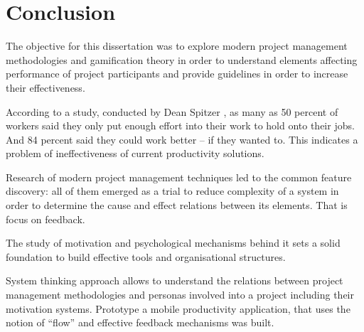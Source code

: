 \chapter*{Conclusion}

The objective for this dissertation was to explore modern project management methodologies and gamification theory in order to understand elements affecting performance of project participants and provide guidelines in order to increase their effectiveness.

According to a study, conducted by Dean Spitzer \cite{spitzer}, as many as 50 percent of workers said they only put enough effort into their work to hold onto their jobs. And 84 percent said they could work better -- if they wanted to. This indicates a problem of ineffectiveness of current productivity solutions.

Research of modern project management techniques led to the common feature discovery: all of them emerged as a trial to reduce complexity of a system in order to determine the cause and effect relations between its elements. That is focus on feedback.

The study of motivation and psychological mechanisms behind it sets a solid foundation to build effective tools and organisational structures.

System thinking approach allows to understand the relations between project management methodologies and personas involved into a project including their motivation systems. Prototype a mobile productivity application, that uses the notion of ``flow'' and effective feedback mechanisms was built.